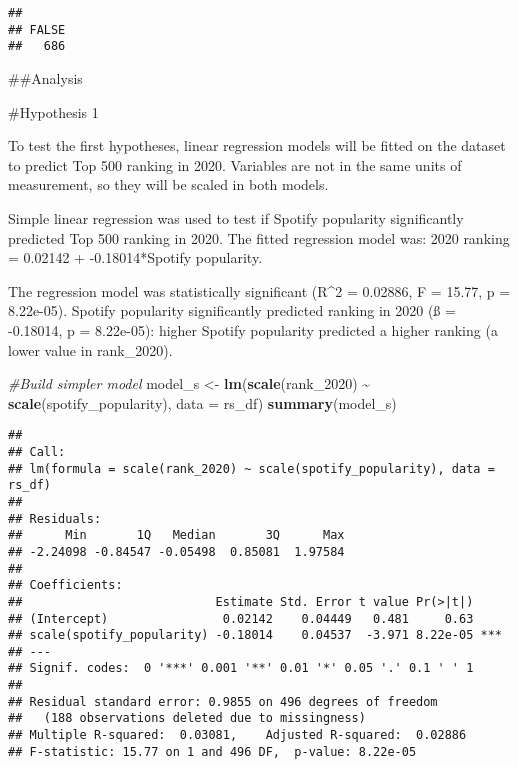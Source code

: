 \documentclass[
]{article}
\newenvironment{Shaded}{\begin{snugshade}}{\end{snugshade}}
\newcommand{\AttributeTok}[1]{\textcolor[rgb]{0.13,0.29,0.53}{#1}}
\newcommand{\CommentTok}[1]{\textcolor[rgb]{0.56,0.35,0.01}{\textit{#1}}}
\newcommand{\FunctionTok}[1]{\textcolor[rgb]{0.13,0.29,0.53}{\textbf{#1}}}
\newcommand{\NormalTok}[1]{#1}
\newcommand{\OtherTok}[1]{\textcolor[rgb]{0.56,0.35,0.01}{#1}}
\newcommand{\SpecialCharTok}[1]{\textcolor[rgb]{0.81,0.36,0.00}{\textbf{#1}}}
\begin{document}
\begin{verbatim}
## 
## FALSE 
##   686
\end{verbatim}

\begin{Shaded}
\end{Shaded}

\#\#Analysis

\#Hypothesis 1

To test the first hypotheses, linear regression models will be fitted on
the dataset to predict Top 500 ranking in 2020. Variables are not in the
same units of measurement, so they will be scaled in both models.

Simple linear regression was used to test if Spotify popularity
significantly predicted Top 500 ranking in 2020. The fitted regression
model was: 2020 ranking = 0.02142 + -0.18014*Spotify popularity.

The regression model was statistically significant (R\^{}2 = 0.02886, F
= 15.77, p = 8.22e-05). Spotify popularity significantly predicted
ranking in 2020 (ß = -0.18014, p = 8.22e-05): higher Spotify popularity
predicted a higher ranking (a lower value in rank\_2020).

\begin{Shaded}
\begin{Highlighting}[]
\CommentTok{\#Build simpler model}
\NormalTok{model\_s }\OtherTok{\textless{}{-}} \FunctionTok{lm}\NormalTok{(}\FunctionTok{scale}\NormalTok{(rank\_2020) }\SpecialCharTok{\textasciitilde{}} \FunctionTok{scale}\NormalTok{(spotify\_popularity), }\AttributeTok{data =}\NormalTok{ rs\_df)}
\FunctionTok{summary}\NormalTok{(model\_s)}
\end{Highlighting}
\end{Shaded}

\begin{verbatim}
## 
## Call:
## lm(formula = scale(rank_2020) ~ scale(spotify_popularity), data = rs_df)
## 
## Residuals:
##      Min       1Q   Median       3Q      Max 
## -2.24098 -0.84547 -0.05498  0.85081  1.97584 
## 
## Coefficients:
##                           Estimate Std. Error t value Pr(>|t|)    
## (Intercept)                0.02142    0.04449   0.481     0.63    
## scale(spotify_popularity) -0.18014    0.04537  -3.971 8.22e-05 ***
## ---
## Signif. codes:  0 '***' 0.001 '**' 0.01 '*' 0.05 '.' 0.1 ' ' 1
## 
## Residual standard error: 0.9855 on 496 degrees of freedom
##   (188 observations deleted due to missingness)
## Multiple R-squared:  0.03081,    Adjusted R-squared:  0.02886 
## F-statistic: 15.77 on 1 and 496 DF,  p-value: 8.22e-05
\end{verbatim}
\end{document}
